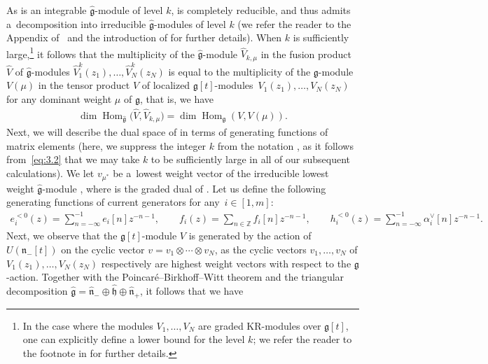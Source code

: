 \documentclass[10pt,a4paper]{amsart}
\numberwithin{equation}{section}
\DeclareMathOperator{\Hom}{Hom}
\begin{document}
As  is an integrable $\widehat{\mathfrak{g}}$-module of level $k$,  is completely reducible, and thus  admits a~decomposition into irreducible $\widehat{\mathfrak{g}}$-modules of level $k$ (we refer the reader to the Appendix of~\cite{FKLMM01} and the introduction of \cite{FJKLM04} for further details). When $k$ is sufficiently large,\footnote{In the case where the modules $V_1,\dots,V_N$ are graded KR-modules over $\mathfrak{g}[t]$, one can explicitly define a lower bound for the level $k$; we refer the reader to the footnote in \cite[Section 5.1]{AK07} for further details.} it follows that the multiplicity of the $\widehat{\mathfrak{g}}$-module $\widehat{V}_{k,\mu}$ in the fusion product $\widehat{V}$ of $\widehat{\mathfrak{g}}$-modules $\widehat{V}_1^k(z_1),\dots,\widehat{V}_N^k(z_N)$ is equal to the multiplicity of the $\mathfrak{g}$-module $V({\mu})$ in the tensor product $V$ of localized $\mathfrak{g}[t]$-modules~${V_1(z_1),\dots,V_N(z_N)}$ for any dominant weight $\mu$ of $\mathfrak{g}$, that is, we have \cite[equation~(3.6)]{AK07}
\begin{gather}\label{eq:3.2}
\dim\Hom_{\widehat{\mathfrak{g}}}\bigl(\widehat{V},\widehat{V}_{k,\mu}\bigr)=\dim\Hom_{\mathfrak{g}}(V, V(\mu)).
\end{gather}
Next, we will describe the dual space  of \smash{$\Hom_{\widehat{\mathfrak{g}}} \bigl(\widehat{V},\widehat{V}_{k,\mu}\bigr)$} in terms of generating functions of matrix elements (here, we suppress the integer $k$ from the notation , as it follows from~\eqref{eq:3.2} that we may take $k$ to be sufficiently large in all of our subsequent calculations). We let $v_{\mu^*}$ be a~lowest weight vector of the irreducible lowest weight $\widehat{\mathfrak{g}}$-module , where  is the graded dual of . Let us define the following generating functions of current generators for any~${i\in[1,m]}$:
\begin{gather*}
e_i^{<0}(z)=\sum_{n=-\infty}^{-1}e_i[n]z^{-n-1},\qquad
f_i(z)=\sum_{n\in\mathbb{Z}}f_i[n]z^{-n-1},\qquad
h_i^{<0}(z)=\sum_{n=-\infty}^{-1}\alpha_i^{\vee}[n]z^{-n-1}.
\end{gather*}
Next, we observe that the $\mathfrak{g}[t]$-module $V$ is generated by the action of $U(\mathfrak{n}_-[t])$ on the cyclic vector $v=v_1 \otimes\cdots\otimes v_N$, as the cyclic vectors $v_1,\dots,v_N$ of $V_1(z_1),\dots,V_N(z_N)$ respectively are highest weight vectors with respect to the $\mathfrak{g}$-action. Together with the Poincar\'e--Birkhoff--Witt theorem and the triangular decomposition $\widehat{\mathfrak{g}}= \widehat{\mathfrak{n}}_-\oplus\widehat{\mathfrak{h}}\oplus \widehat{\mathfrak{n}}_+$, it follows that we have
\end{document}
